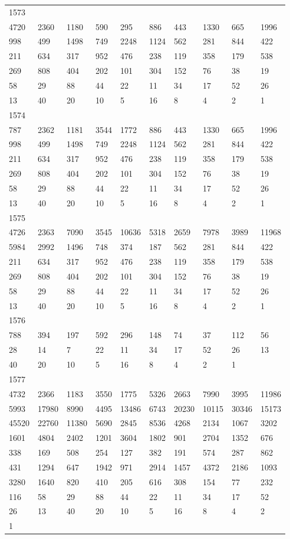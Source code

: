 \begin{longtable}{*{10}{l}}
1573&&&&&&&&&\\
4720& 2360& 1180& 590& 295& 886& 443& 1330& 665& 1996\\
998& 499& 1498& 749& 2248& 1124& 562& 281& 844& 422\\
211& 634& 317& 952& 476& 238& 119& 358& 179& 538\\
269& 808& 404& 202& 101& 304& 152& 76& 38& 19\\
58& 29& 88& 44& 22& 11& 34& 17& 52& 26\\
13& 40& 20& 10& 5& 16& 8& 4& 2& 1\\

1574&&&&&&&&&\\
787& 2362& 1181& 3544& 1772& 886& 443& 1330& 665& 1996\\
998& 499& 1498& 749& 2248& 1124& 562& 281& 844& 422\\
211& 634& 317& 952& 476& 238& 119& 358& 179& 538\\
269& 808& 404& 202& 101& 304& 152& 76& 38& 19\\
58& 29& 88& 44& 22& 11& 34& 17& 52& 26\\
13& 40& 20& 10& 5& 16& 8& 4& 2& 1\\

1575&&&&&&&&&\\
4726& 2363& 7090& 3545& 10636& 5318& 2659& 7978& 3989& 11968\\
5984& 2992& 1496& 748& 374& 187& 562& 281& 844& 422\\
211& 634& 317& 952& 476& 238& 119& 358& 179& 538\\
269& 808& 404& 202& 101& 304& 152& 76& 38& 19\\
58& 29& 88& 44& 22& 11& 34& 17& 52& 26\\
13& 40& 20& 10& 5& 16& 8& 4& 2& 1\\

1576&&&&&&&&&\\
788& 394& 197& 592& 296& 148& 74& 37& 112& 56\\
28& 14& 7& 22& 11& 34& 17& 52& 26& 13\\
40& 20& 10& 5& 16& 8& 4& 2& 1& \\

1577&&&&&&&&&\\
4732& 2366& 1183& 3550& 1775& 5326& 2663& 7990& 3995& 11986\\
5993& 17980& 8990& 4495& 13486& 6743& 20230& 10115& 30346& 15173\\
45520& 22760& 11380& 5690& 2845& 8536& 4268& 2134& 1067& 3202\\
1601& 4804& 2402& 1201& 3604& 1802& 901& 2704& 1352& 676\\
338& 169& 508& 254& 127& 382& 191& 574& 287& 862\\
431& 1294& 647& 1942& 971& 2914& 1457& 4372& 2186& 1093\\
3280& 1640& 820& 410& 205& 616& 308& 154& 77& 232\\
116& 58& 29& 88& 44& 22& 11& 34& 17& 52\\
26& 13& 40& 20& 10& 5& 16& 8& 4& 2\\
1& \\


\end{longtable}

